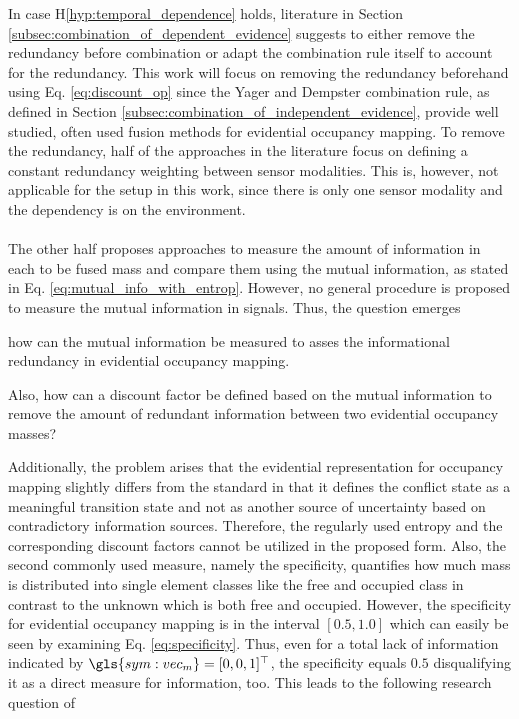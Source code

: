 In case H\ref{hyp:temporal_dependence} holds, literature in Section \ref{subsec:combination_of_dependent_evidence} suggests to either remove the redundancy before combination or adapt the combination rule itself to account for the redundancy. This work will focus on removing the redundancy beforehand using Eq. \ref{eq:discount_op} since the Yager and Dempster combination rule, as defined in Section \ref{subsec:combination_of_independent_evidence}, provide well studied, often used fusion methods for evidential occupancy mapping. To remove the redundancy, half of the approaches in the literature focus on defining a constant redundancy weighting between sensor modalities. This is, however, not applicable for the setup in this work, since there is only one sensor modality and the dependency is on the environment.
\\\\
The other half proposes approaches to measure the amount of information in each to be fused mass and compare them using the mutual information, as stated in Eq. \ref{eq:mutual_info_with_entrop}. However, no general procedure is proposed to measure the mutual information in signals. Thus, the question emerges
\\
\begin{requ} \label{requ:how_to_meas_redund}
	how can the mutual information be measured to asses the informational redundancy in evidential occupancy mapping.
\end{requ}
\vspace{\baselineskip}
\begin{requ} \label{requ:how_to_define_discount_fact}
	Also, how can a discount factor be defined based on the mutual information to remove the amount of redundant information between two evidential occupancy masses?
\end{requ}
Additionally, the problem arises that the evidential representation for occupancy mapping slightly differs from the standard in that it defines the conflict state as a meaningful transition state and not as another source of uncertainty based on contradictory information sources. Therefore, the regularly used entropy and the corresponding discount factors cannot be utilized in the proposed form. Also, the second commonly used measure, namely the specificity, quantifies how much mass is distributed into single element classes like the free and occupied class in contrast to the unknown which is both free and occupied. However, the specificity for evidential occupancy mapping is in the interval $[0.5,1.0]$ which can easily be seen by examining Eq. \ref{eq:specificity}. Thus, even for a total lack of information indicated by $\gls{sym:vec_m} = [0,0,1]^\top$, the specificity equals $0.5$ disqualifying it as a direct measure for information, too. This leads to the following research question of
